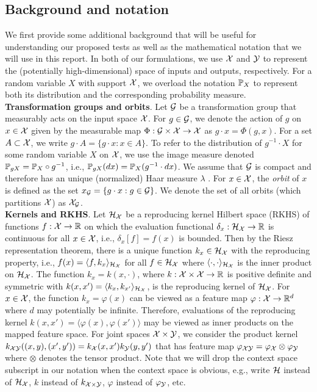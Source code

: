 \subsection{Background and notation} \label{sec:background}

We first provide some additional background that will be useful for understanding our proposed tests as well as the mathematical notation that we will use in this report. In both of our formulations, we use $\calX$ and $\calY$ to represent the (potentially high-dimensional) space of inputs and outputs, respectively. For a random variable $X$ with support $\calX$, we overload the notation $\P_X$ to represent both its distribution and the corresponding probability measure.
\\

\textbf{Transformation groups and orbits}. Let $\calG$ be a transformation group that measurably acts on the input space $\calX$. For $g\in\calG$, we denote the action of $g$ on $x\in\calX$ given by the measurable map $\Phi:\calG\times\calX\rightarrow\calX$ as $g\cdot x = \Phi(g,x)$. For a set $A\subset\calX$, we write $g\cdot A=\{g\cdot x: x\in A\}$. To refer to the distribution of $g^{-1}\cdot X$ for some random variable $X$ on $\calX$, we use the image measure denoted $\P_{gX}=\P_X\circ g^{-1}$, i.e., $\P_{gX}(dx)=\P_X(g^{-1}\cdot dx)$. We assume that $\calG$ is compact and therefore has an unique (normalized) Haar measure $\lambda$ \parencite[Theorem~2.10]{Folland:2016}. For $x\in\calX$, the \textit{orbit} of $x$ is defined as the set $x_\calG=\{g\cdot x:g\in\calG\}$. We denote the set of all orbits (which partitions $\calX$) as $\calX_\calG$.
\\

\textbf{Kernels and RKHS}. Let $\calH_\calX$ be a reproducing kernel Hilbert space (RKHS) of functions $f:\calX\rightarrow\bbR$ on which the evaluation functional $\delta_x:\calH_\calX\rightarrow\bbR$ is continuous for all $x\in\calX$, i.e., $\delta_x[f]=f(x)$ is bounded. Then by the Riesz representation theorem, there is a unique function $k_x\in\calH_\calX$ with the reproducing property, i.e., $f(x)=\langle f,k_x\rangle_{\calH_\calX}$ for all $f\in\calH_\calX$ where $\langle\cdot,\cdot\rangle_{\calH_\calX}$ is the inner product on $\calH_{\calX}$. The function $k_x=k(x,\cdot)$, where $k:\calX\times\calX\rightarrow\bbR$ is positive definite and symmetric with $k(x,x')=\langle k_x,k_{x'}\rangle_{\calH_\calX}$, is the reproducing kernel of $\calH_\calX$. For $x\in\calX$, the function $k_x=\varphi(x)$ can be viewed as a feature map $\varphi:\calX\rightarrow\bbR^d$ where $d$ may potentially be infinite. Therefore, evaluations of the reproducing kernel $k(x,x')=\langle \varphi(x),\varphi(x')\rangle$ may be viewed as inner products on the mapped feature space. For joint spaces $\calX\times\calY$, we consider the product kernel $k_{\calX\calY}((x,y),(x',y'))=k_\calX(x,x')k_\calY(y,y')$ that has feature map $\varphi_{\calX\calY}=\varphi_\calX\otimes\varphi_\calY$ where $\otimes$ denotes the tensor product. Note that we will drop the context space subscript in our notation when the context space is obvious, e.g., write $\calH$ instead of $\calH_\calX$, $k$ instead of $k_{\calX\times\calY}$, $\varphi$ instead of $\varphi_\calY$, etc.
\\

